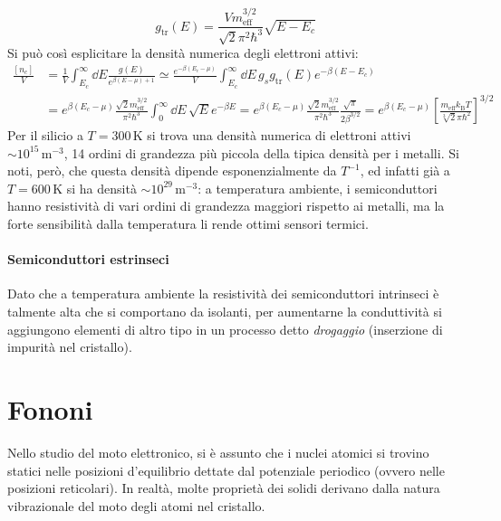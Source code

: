 \begin{equation*}
	g_\text{tr}(E) = \frac{V m_\text{eff}^{3/2}}{\sqrt{2} \pi^2 \hbar^3} \sqrt{E - E_c}
\end{equation*}
Si può così esplicitare la densità numerica degli elettroni attivi:
\begin{equation*}
	\begin{split}
		\frac{[n_c]}{V}
		& = \frac{1}{V} \int_{E_c}^\infty \dd E \frac{g(E)}{e^{\beta (E - \mu) + 1}} \simeq \frac{e^{-\beta (E_c - \mu)}}{V} \int_{E_c}^\infty \dd E\, g_s g_\text{tr}(E) e^{-\beta (E - E_c)} \\
		& = e^{\beta (E_c - \mu)} \frac{\sqrt{2} m_\text{eff}^{3/2}}{\pi^2 \hbar^3} \int_0^\infty \dd E\, \sqrt{E} e^{-\beta E} = e^{\beta (E_c - \mu)} \frac{\sqrt{2} m_\text{eff}^{3/2}}{\pi^2 \hbar^3} \frac{\sqrt{\pi}}{2 \beta^{3/2}} = e^{\beta (E_c - \mu)} \left[ \frac{m_\text{eff} k_\text{B} T}{\sqrt[3]{2} \pi \hbar^2} \right]^{3/2}
	\end{split}
\end{equation*}
Per il silicio a $ T = 300 \,\text{K} $ si trova una densità numerica di elettroni attivi $ \sim 10^{15} \,\text{m}^{-3} $, 14 ordini di grandezza più piccola della tipica densità per i metalli. Si noti, però, che questa densità dipende esponenzialmente da $ T^{-1} $, ed infatti già a $ T = 600\,\text{K} $ si ha densità $ \sim 10^{29} \,\text{m}^{-3} $: a temperatura ambiente, i semiconduttori hanno resistività di vari ordini di grandezza maggiori rispetto ai metalli, ma la forte sensibilità dalla temperatura li rende ottimi sensori termici.

\paragraph{Semiconduttori estrinseci}

Dato che a temperatura ambiente la resistività dei semiconduttori intrinseci è talmente alta che si comportano da isolanti, per aumentarne la conduttività si aggiungono elementi di altro tipo in un processo detto \textit{drogaggio} (inserzione di impurità nel cristallo).

\section{Fononi}

Nello studio del moto elettronico, si è assunto che i nuclei atomici si trovino statici nelle posizioni d'equilibrio dettate dal potenziale periodico (ovvero nelle posizioni reticolari). In realtà, molte proprietà dei solidi derivano dalla natura vibrazionale del moto degli atomi nel cristallo.

